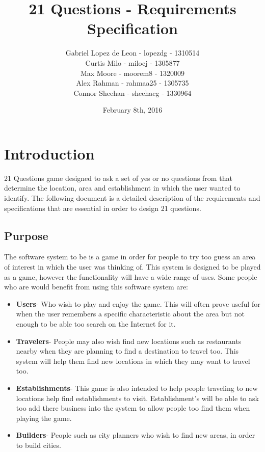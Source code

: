 \documentclass[titlepage]{article}
\title{\textbf{21 Questions - Requirements Specification}}
\author{Gabriel Lopez de Leon - lopezdg - 1310514\\Curtis Milo - milocj - 1305877\\Max Moore - moorem8 - 1320009\\Alex Rahman - rahmaa25 - 1305735\\Connor Sheehan - sheehacg - 1330964}
\date{February 8th, 2016}
\newcounter{req}
\begin{document}
	
	\maketitle
	\vspace{4cm}	
		\newpage
		\tableofcontents
		\newpage
		\section{Introduction}
		\label{sec:introduction}
		
		21 Questions game designed to ask a set of yes or no questions from that determine the location, area and establishment in which the user wanted to identify. The following document is a detailed description of the requirements and specifications that are essential in order to design 21 questions.
		
		\subsection{Purpose}
		\label{sub:purpose}
		
		
		The software system to be is a game in order for people to try too guess an area of interest in which the user was thinking of. This system is designed to be played as a game, however the functionality will have a wide range of uses. Some people who are would benefit from using this software system are:
		
		\begin{itemize}
			
			\item \textbf{Users}- Who wish to play and enjoy the game. This will often prove useful for when the user remembers a specific characteristic about the area but not enough to be able too search on the Internet for it. 
			\item \textbf{Travelers}- People may also wish find new locations such as restaurants nearby when they are planning to find a destination to travel too. This system will help them find new locations in which they may want to travel too.
			\item \textbf{Establishments}- This game is also intended to help people traveling to new locations help find establishments to visit. Establishment's will be able to ask too add there business into the system to allow people too find them when playing the game.
			\item \textbf{Builders}- People such as city planners who wish to find new areas, in order to build cities.
			
		\end{itemize}
		
\end{document}
